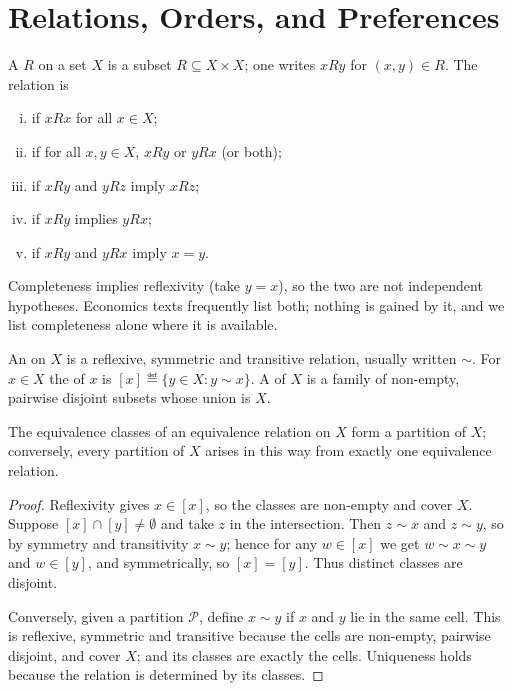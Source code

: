\section{Relations, Orders, and Preferences}\label{sec:sets-relations}

\begin{definition}\label{def:relation}
	A  $R$ on a set $X$ is a subset $R\subseteq X\times X$; one
	writes $xRy$ for $(x,y)\in R$. The relation is
	\begin{enumerate}[(i)]
		\item {} if $xRx$ for all $x\in X$;
		\item {} if for all $x,y\in X$, $xRy$ or $yRx$
		      (or both);
		\item {} if $xRy$ and $yRz$ imply $xRz$;
		\item {} if $xRy$ implies $yRx$;
		\item {} if $xRy$ and $yRx$ imply
		      $x=y$.
	\end{enumerate}
\end{definition}

Completeness implies reflexivity (take $y=x$), so the two are not independent
hypotheses. Economics texts frequently list both; nothing is gained by it, and we
list completeness alone where it is available.

\begin{definition}\label{def:equivalence}
	An  on $X$ is a reflexive, symmetric and transitive
	relation, usually written $\sim$. For $x\in X$ the  of
	$x$ is $[x]\eqdef\{y\in X : y\sim x\}$. A  of $X$ is a family of
	non-empty, pairwise disjoint subsets whose union is $X$.
\end{definition}

\begin{proposition}\label{prop:equivalence-partition}
	The equivalence classes of an equivalence relation on $X$ form a partition of
	$X$; conversely, every partition of $X$ arises in this way from exactly one
	equivalence relation.
\end{proposition}

\begin{proof}
	Reflexivity gives $x\in[x]$, so the classes are non-empty and cover $X$. Suppose
	$[x]\cap[y]\neq\emptyset$ and take $z$ in the intersection. Then $z\sim x$ and
	$z\sim y$, so by symmetry and transitivity $x\sim y$; hence for any $w\in[x]$ we
	get $w\sim x\sim y$ and $w\in[y]$, and symmetrically, so $[x]=[y]$. Thus distinct
	classes are disjoint.

	Conversely, given a partition $\mathcal{P}$, define $x\sim y$ if $x$ and $y$ lie
	in the same cell. This is reflexive, symmetric and transitive because the cells
	are non-empty, pairwise disjoint, and cover $X$; and its classes are exactly the
	cells. Uniqueness holds because the relation is determined by its classes.
\end{proof}


